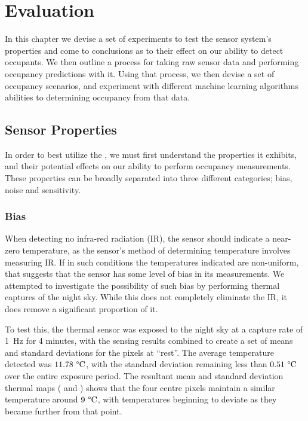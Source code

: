 \documentclass[../thesis/thesis.tex]{subfiles}
\begin{document}
 \chapter{Evaluation}
 \label{chap:evaluation}

In this chapter we devise a set of experiments to test the sensor system's properties and come to conclusions as to their effect on our ability to detect occupants. We then outline a process for taking raw sensor data and performing occupancy predictions with it. Using that process, we then devise a set of occupancy scenarios, and experiment with different machine learning algorithms abilities to determining occupancy from that data.

\section{Sensor Properties}

In order to best utilize the \mlx, we must first understand the properties it exhibits, and their potential effects on our ability to perform occupancy measurements. These properties can be broadly separated into three different categories; bias, noise and sensitivity.

\subsection{Bias}
When detecting no infra-red radiation (IR), the sensor should indicate a near-zero temperature, as the sensor's method of determining temperature involves measuring IR. If in such conditions the temperatures indicated are non-uniform, that suggests that the sensor has some level of bias in its measurements. We attempted to investigate the possibility of such bias by performing thermal captures of the night sky. While this does not completely eliminate the IR, it does remove a significant proportion of it.

To test this, the thermal sensor was exposed to the night sky at a capture rate of 1~Hz for 4 minutes, with the sensing results combined to create a set of means and standard deviations for the pixels at ``rest''. The average temperature detected was $11.78~\degree\textrm{C}$, with the standard deviation remaining less than $0.51~\degree\textrm{C}$ over the entire exposure period. The resultant mean and standard deviation thermal maps ( and ) shows that the four centre pixels maintain a similar temperature around $9~\degree\textrm{C}$, with temperatures beginning to deviate as they became further from that point.
\end{document}
